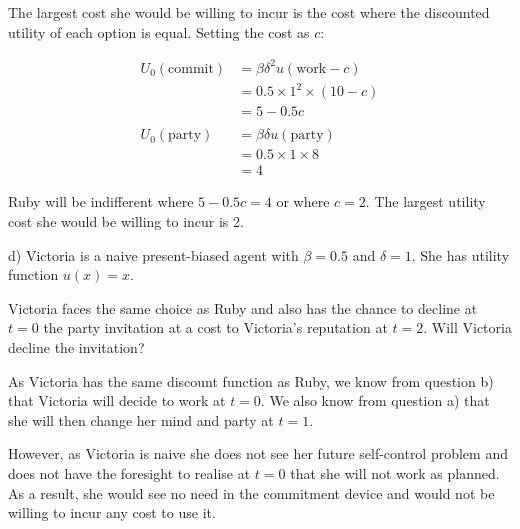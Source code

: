 \documentclass[
  letterpaper,
  DIV=11,
  numbers=noendperiod]{scrreprt}
\begin{document}
\begin{tcolorbox}[enhanced jigsaw, title=\textcolor{quarto-callout-tip-color}{\faLightbulb}\hspace{0.5em}{Answer}, toprule=.15mm, colback=white, breakable, titlerule=0mm, colframe=quarto-callout-tip-color-frame, coltitle=black, opacityback=0, rightrule=.15mm, colbacktitle=quarto-callout-tip-color!10!white, bottomtitle=1mm, opacitybacktitle=0.6, arc=.35mm, bottomrule=.15mm, toptitle=1mm, leftrule=.75mm, left=2mm]

The largest cost she would be willing to incur is the cost where the
discounted utility of each option is equal. Setting the cost as \(c\):

\begin{align*}
U_0(\text{commit})&=\beta\delta^2 u(\text{work}-c) \\
&=0.5\times 1^2\times (10-c) \\
&=5-0.5c \\
\\
U_0(\text{party})&=\beta\delta u(\text{party}) \\
&=0.5\times 1\times 8 \\
&=4
\end{align*}

Ruby will be indifferent where \(5-0.5c=4\) or where \(c=2\). The
largest utility cost she would be willing to incur is 2.

\end{tcolorbox}

d) Victoria is a naive present-biased agent with \(\beta=0.5\) and
\(\delta=1\). She has utility function \(u(x)=x\).

Victoria faces the same choice as Ruby and also has the chance to
decline at \(t=0\) the party invitation at a cost to Victoria's
reputation at \(t=2\). Will Victoria decline the invitation?

\begin{tcolorbox}[enhanced jigsaw, title=\textcolor{quarto-callout-tip-color}{\faLightbulb}\hspace{0.5em}{Answer}, toprule=.15mm, colback=white, breakable, titlerule=0mm, colframe=quarto-callout-tip-color-frame, coltitle=black, opacityback=0, rightrule=.15mm, colbacktitle=quarto-callout-tip-color!10!white, bottomtitle=1mm, opacitybacktitle=0.6, arc=.35mm, bottomrule=.15mm, toptitle=1mm, leftrule=.75mm, left=2mm]

As Victoria has the same discount function as Ruby, we know from
question b) that Victoria will decide to work at \(t=0\). We also know
from question a) that she will then change her mind and party at
\(t=1\).

However, as Victoria is naive she does not see her future self-control
problem and does not have the foresight to realise at \(t=0\) that she
will not work as planned. As a result, she would see no need in the
commitment device and would not be willing to incur any cost to use it.

\end{tcolorbox}
\end{document}

